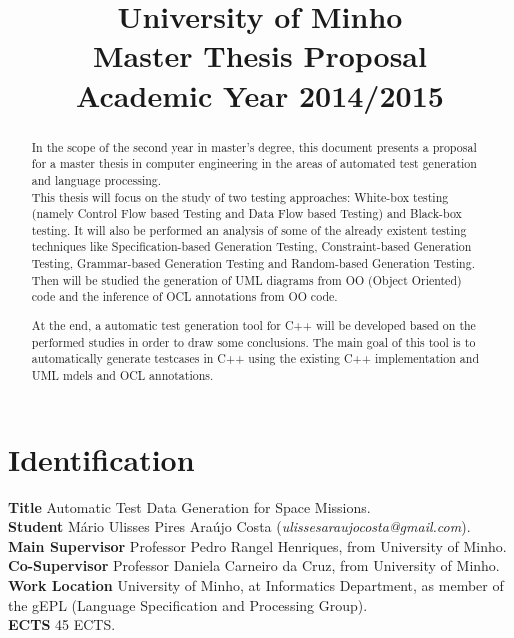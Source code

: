 \documentclass[a4paper,12pt]{article}
\title{\huge \bigskip
{\LARGE University of Minho}\\[13pt]
{\large Master Thesis Proposal}\\[13pt]
{\large Academic Year 2014/2015}
}\author{}\date{}
\begin{document}
\maketitle
{}

\section*{\Large Identification}
\textbf{Title} Automatic Test Data Generation for Space Missions.\\[6pt]
\textbf{Student} Mário Ulisses Pires Araújo Costa (\emph{ulissesaraujocosta@gmail.com}).\\[6pt]
\textbf{Main Supervisor} Professor Pedro Rangel Henriques, from University of Minho.\\[6pt]
\textbf{Co-Supervisor} Professor Daniela Carneiro da Cruz, from University of Minho.\\[6pt]
\textbf{Work Location} University of Minho, at Informatics Department, as member of the gEPL (Language Specification and Processing Group).\\[6pt]
\textbf{ECTS} 45 ECTS.\\[12pt]

\begin{abstract}
In the scope of the second year in master's degree, this document presents a proposal for a master thesis in computer engineering in
the areas of automated test generation and language processing.\\[6pt]
This thesis will focus on the study of two testing approaches: White-box testing
(namely Control Flow based Testing\cite{stt} and Data Flow based Testing\cite{dataflow})
and Black-box testing\cite{black}.
It will also be performed an analysis of some of the already existent testing techniques like
Specification-based Generation Testing\cite{Offutt:1999:GTU:1767297.1767341,Horcher95improvingsoftware,Stocks:1996:FST:239916.239918},
Constraint-based Generation Testing\cite{DeMillo91constraint-basedautomatic},
Grammar-based Generation Testing\cite{1994-burgess,Burgess_Saidi_1996}
and Random-based Generation Testing.
Then will be studied the generation of UML diagrams from OO (Object Oriented) code and the inference of OCL annotations from OO code.

At the end, a automatic test generation tool for C++ will be developed based on the performed studies in order to draw some conclusions.
The main goal of this tool is to automatically generate testcases in C++ using the existing C++ implementation and UML mdels and OCL annotations.
\end{abstract}
\end{document}
